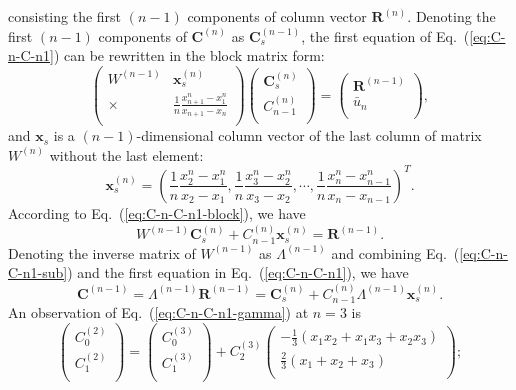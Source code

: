 \documentclass[]{article}
\def\Matrix#1{\left(#1\right)}
\def\Matrix#1{\left(#1\right)}
\begin{document}
consisting the first $(n-1)$ components of column vector $\bm R^{(n)}$.
Denoting the first $(n-1)$ components of $\bm C^{(n)}$ as $\bm C_s^{(n-1)}$, the
first equation of Eq.~(\ref{eq:C-n-C-n1}) can be rewritten in the block matrix
form:
\begin{equation}
\Matrix{\begin{array}{cc}
W^{(n-1)} & \bm x^{(n)}_s \\ \times & \frac{1}{n}\frac{x_{n+1}^n-x_1^n}{x_{n+1}-x_n} \\
\end{array}}
\Matrix{\begin{array}{c}\bm C^{(n)}_s \\ C^{(n)}_{n-1} \\ \end{array}} =
\Matrix{\begin{array}{c}\bm R^{(n-1)} \\ \bar u_{n} \\ \end{array}},
\label{eq:C-n-C-n1-block}
\end{equation}
and $\bm x_s$ is a $(n-1)$-dimensional column vector of the last column of matrix
$W^{(n)}$ without the last element:
\[
\bm x_s^{(n)}=\left(\frac{1}{n}\frac{x_2^n-x_1^n}{x_2-x_1},\frac{1}{n}\frac{x_3^n-x_2^n}{x_3-x_2},\cdots,\frac{1}{n}\frac{x_{n}^n-x_{n-1}^n}{x_{n}-x_{n-1}}\right)^T.
\]
According to Eq.~(\ref{eq:C-n-C-n1-block}), we have
\begin{equation}
W^{(n-1)}\bm C^{(n)}_s + C^{(n)}_{n-1}\bm x_s^{(n)}=\bm R^{(n-1)}.
\label{eq:C-n-C-n1-sub}
\end{equation}
Denoting the inverse matrix of $W^{(n-1)}$ as $\Lambda^{(n-1)}$ and combining
Eq.~(\ref{eq:C-n-C-n1-sub}) and the first equation in Eq.~(\ref{eq:C-n-C-n1}), we
have
\begin{equation}
\bm C^{(n-1)}=\Lambda^{(n-1)}\bm R^{(n-1)}=\bm C^{(n)}_s + C^{(n)}_{n-1}\Lambda^{(n-1)}\bm x_s^{(n)}.
\label{eq:C-n-C-n1-gamma}
\end{equation}
An observation of Eq.~(\ref{eq:C-n-C-n1-gamma}) at $n=3$ is
\[
\Matrix{\begin{array}{c}C_0^{(2)}\\ C_1^{(2)}\\ \end{array}}=
\Matrix{\begin{array}{c}C_0^{(3)}\\ C_1^{(3)}\\ \end{array}}
+C_2^{(3)}\Matrix{\begin{array}{c} -\frac{1}{3}(x_1x_2+x_1x_3+x_2x_3)\\ \frac{2}{3}(x_1+x_2+x_3) \\ \end{array}};
\]
\end{document}
